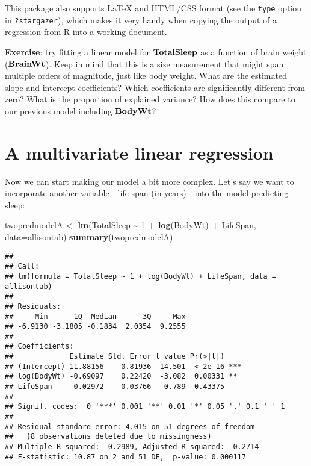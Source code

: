 \documentclass[
]{book}
\newenvironment{Shaded}{\begin{snugshade}}{\end{snugshade}}
\newcommand{\DataTypeTok}[1]{\textcolor[rgb]{0.13,0.29,0.53}{#1}}
\newcommand{\DecValTok}[1]{\textcolor[rgb]{0.00,0.00,0.81}{#1}}
\newcommand{\KeywordTok}[1]{\textcolor[rgb]{0.13,0.29,0.53}{\textbf{#1}}}
\newcommand{\NormalTok}[1]{#1}
\newcommand{\OperatorTok}[1]{\textcolor[rgb]{0.81,0.36,0.00}{\textbf{#1}}}
\newcommand{\StringTok}[1]{\textcolor[rgb]{0.31,0.60,0.02}{#1}}
\begin{document}
This package also supports LaTeX and HTML/CSS format (see the \texttt{type} option in \texttt{?stargazer}), which makes it very handy when copying the output of a regression from R into a working document.

\textbf{Exercise}: try fitting a linear model for \(\bf{TotalSleep}\) as a function of brain weight (\(\bf{BrainWt}\)). Keep in mind that this is a size measurement that might span multiple orders of magnitude, just like body weight. What are the estimated slope and intercept coefficients? Which coefficients are significantly different from zero? What is the proportion of explained variance? How does this compare to our previous model including \(\bf{BodyWt}\)?

\hypertarget{a-multivariate-linear-regression}{%
\section{A multivariate linear regression}\label{a-multivariate-linear-regression}}

Now we can start making our model a bit more complex. Let's say we want to incorporate another variable - life span (in years) - into the model predicting sleep:

\begin{Shaded}
\begin{Highlighting}[]
\NormalTok{twopredmodelA \textless{}{-}}\StringTok{ }\KeywordTok{lm}\NormalTok{(TotalSleep }\OperatorTok{\textasciitilde{}}\StringTok{ }\DecValTok{1} \OperatorTok{+}\StringTok{ }\KeywordTok{log}\NormalTok{(BodyWt) }\OperatorTok{+}\StringTok{ }\NormalTok{LifeSpan, }\DataTypeTok{data=}\NormalTok{allisontab)}
\KeywordTok{summary}\NormalTok{(twopredmodelA)}
\end{Highlighting}
\end{Shaded}

\begin{verbatim}
## 
## Call:
## lm(formula = TotalSleep ~ 1 + log(BodyWt) + LifeSpan, data = allisontab)
## 
## Residuals:
##     Min      1Q  Median      3Q     Max 
## -6.9130 -3.1805 -0.1834  2.0354  9.2555 
## 
## Coefficients:
##             Estimate Std. Error t value Pr(>|t|)    
## (Intercept) 11.88156    0.81936  14.501  < 2e-16 ***
## log(BodyWt) -0.69097    0.22420  -3.082  0.00331 ** 
## LifeSpan    -0.02972    0.03766  -0.789  0.43375    
## ---
## Signif. codes:  0 '***' 0.001 '**' 0.01 '*' 0.05 '.' 0.1 ' ' 1
## 
## Residual standard error: 4.015 on 51 degrees of freedom
##   (8 observations deleted due to missingness)
## Multiple R-squared:  0.2989, Adjusted R-squared:  0.2714 
## F-statistic: 10.87 on 2 and 51 DF,  p-value: 0.000117
\end{verbatim}
\end{document}
